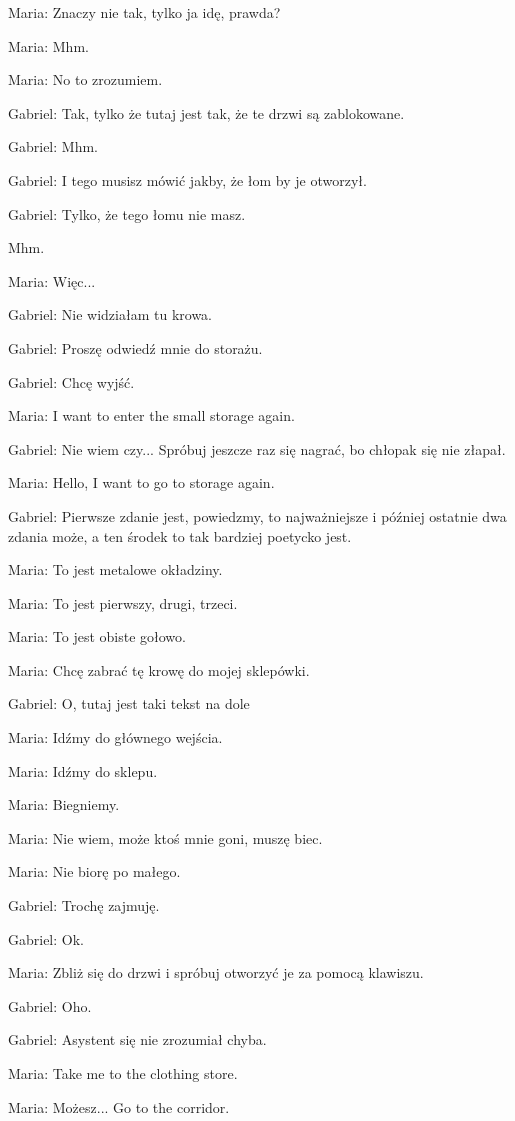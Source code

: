 Maria: Znaczy nie tak, tylko ja idę, prawda?

Maria: Mhm.

Maria: No to zrozumiem.

Gabriel: Tak, tylko że tutaj jest tak, że te drzwi są zablokowane.

Gabriel: Mhm.

Gabriel: I tego musisz mówić jakby, że łom by je otworzył.

Gabriel: Tylko, że tego łomu nie masz.

Mhm.

Maria: Więc...

Gabriel: Nie widziałam tu krowa.

Gabriel: Proszę odwiedź mnie do storażu.

Gabriel: Chcę wyjść.

Maria: I want to enter the small storage again.

Gabriel: Nie wiem czy... Spróbuj jeszcze raz się nagrać, bo chłopak się nie złapał.

Maria: Hello, I want to go to storage again.

Gabriel: Pierwsze zdanie jest, powiedzmy, to najważniejsze i później ostatnie dwa zdania może, a ten środek to tak bardziej poetycko jest.

Maria: To jest metalowe okładziny.

Maria: To jest pierwszy, drugi, trzeci.

Maria: To jest obiste gołowo.

Maria: Chcę zabrać tę krowę do mojej sklepówki.

Gabriel: O, tutaj jest taki tekst na dole

Maria: Idźmy do głównego wejścia.

Maria: Idźmy do sklepu.

Maria: Biegniemy.

Maria: Nie wiem, może ktoś mnie goni, muszę biec.

Maria: Nie biorę po małego.

Gabriel: Trochę zajmuję.

Gabriel: Ok.

Maria: Zbliż się do drzwi i spróbuj otworzyć je za pomocą klawiszu.

Gabriel: Oho.

Gabriel: Asystent się nie zrozumiał chyba.

Maria: Take me to the clothing store.

Maria: Możesz... Go to the corridor.

